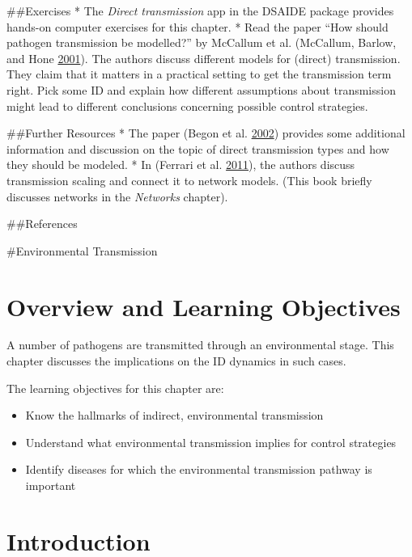 \documentclass[]{book}
\providecommand{\tightlist}{%
  \setlength{\itemsep}{0pt}\setlength{\parskip}{0pt}}
\theoremstyle{definition}
\theoremstyle{definition}
\theoremstyle{definition}
\theoremstyle{remark}
\begin{document}
\#\#Exercises * The \emph{Direct transmission} app in the DSAIDE package
provides hands-on computer exercises for this chapter. * Read the paper
``How should pathogen transmission be modelled?'' by McCallum et al.
(McCallum, Barlow, and Hone \protect\hyperlink{ref-mccallum01}{2001}).
The authors discuss different models for (direct) transmission. They
claim that it matters in a practical setting to get the transmission
term right. Pick some ID and explain how different assumptions about
transmission might lead to different conclusions concerning possible
control strategies.

\#\#Further Resources * The paper (Begon et al.
\protect\hyperlink{ref-begon02}{2002}) provides some additional
information and discussion on the topic of direct transmission types and
how they should be modeled. * In (Ferrari et al.
\protect\hyperlink{ref-ferrari11}{2011}), the authors discuss
transmission scaling and connect it to network models. (This book
briefly discusses networks in the \emph{Networks } chapter).

\#\#References

\#Environmental Transmission

\hypertarget{overview-and-learning-objectives-6}{%
\section{Overview and Learning
Objectives}\label{overview-and-learning-objectives-6}}

A number of pathogens are transmitted through an environmental stage.
This chapter discusses the implications on the ID dynamics in such
cases.

The learning objectives for this chapter are:

\begin{itemize}
\tightlist
\item
  Know the hallmarks of indirect, environmental transmission
\item
  Understand what environmental transmission implies for control
  strategies
\item
  Identify diseases for which the environmental transmission pathway is
  important
\end{itemize}

\hypertarget{introduction-4}{%
\section{Introduction}\label{introduction-4}}
\end{document}
